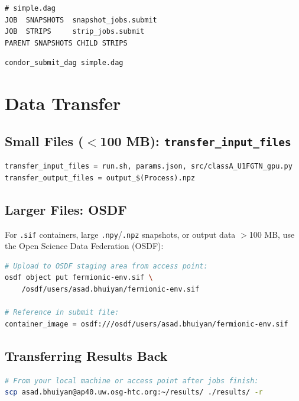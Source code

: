 \documentclass[11pt]{article}
\begin{document}
\begin{lstlisting}
# simple.dag
JOB  SNAPSHOTS  snapshot_jobs.submit
JOB  STRIPS     strip_jobs.submit
PARENT SNAPSHOTS CHILD STRIPS
\end{lstlisting}

\begin{lstlisting}[language=bash]
condor_submit_dag simple.dag
\end{lstlisting}

\section{Data Transfer}

\subsection{Small Files ($<$100 MB): \texttt{transfer\_input\_files}}

\begin{lstlisting}
transfer_input_files = run.sh, params.json, src/classA_U1FGTN_gpu.py
transfer_output_files = output_$(Process).npz
\end{lstlisting}

\subsection{Larger Files: OSDF}

For \texttt{.sif} containers, large \texttt{.npy}/\texttt{.npz} snapshots, or
output data $>$100 MB, use the Open Science Data Federation (OSDF):

\begin{lstlisting}[language=bash]
# Upload to OSDF staging area from access point:
osdf object put fermionic-env.sif \
    /osdf/users/asad.bhuiyan/fermionic-env.sif

# Reference in submit file:
container_image = osdf:///osdf/users/asad.bhuiyan/fermionic-env.sif
\end{lstlisting}

\subsection{Transferring Results Back}

\begin{lstlisting}[language=bash]
# From your local machine or access point after jobs finish:
scp asad.bhuiyan@ap40.uw.osg-htc.org:~/results/ ./results/ -r
\end{lstlisting}
\end{document}
